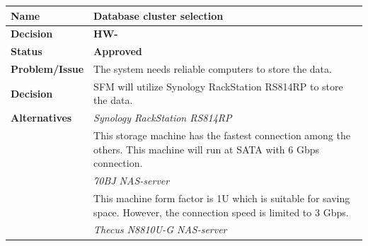 \begin{table}[h!]
\begin{tabular}{L{0.2\textwidth} L{0.6\textwidth}}
    \textbf{Name}           & \textbf{Database cluster selection} \\ \toprule
    \textbf{Decision}       & \textbf{HW-\textbf{}}\\ \midrule
    \textbf{Status}         & \textbf{Approved} \\ \midrule
    \textbf{Problem/Issue}  & The system needs reliable computers to store the data. \\ \midrule
    \textbf{Decision}       & SFM will utilize Synology RackStation RS814RP to store the data.\\ \midrule
    \textbf{Alternatives}   & \textit{Synology RackStation RS814RP}\\
                            & This storage machine has the fastest connection among the others. This machine will run at SATA with 6 Gbps connection.\\
                            & \textit{70BJ NAS-server}\\
                            & This machine form factor is 1U which is suitable for saving space. However, the connection speed is limited to 3 Gbps.\\
                            & \textit{Thecus N8810U-G NAS-server} \\

\end{tabular}
\end{table}

